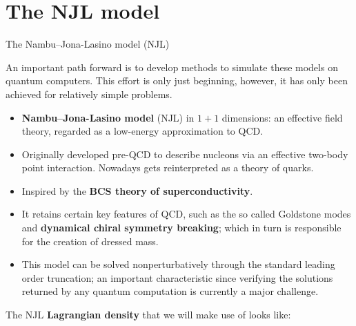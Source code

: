
\section{The NJL model}


\begin{frame}[allowframebreaks]{The Nambu--Jona-Lasino model (NJL)}

	An important path forward is to develop methods to simulate these models on quantum computers. This effort is only just beginning, however, it has only been achieved for relatively simple problems.

	\medskip

	\begin{itemize}
		\item<2-> \textbf{Nambu--Jona-Lasino model} (NJL) in $1+1$ dimensions: an effective field theory, regarded as a low-energy approximation to QCD.
    \item<2-> Originally developed pre-QCD to describe nucleons via an effective two-body point interaction. Nowadays gets reinterpreted as a theory of quarks.
    \item<2-> Inspired by the \textbf{BCS theory of superconductivity}.
		\item<3-> It retains certain key features of QCD, such as the so called Goldstone modes and \textbf{dynamical chiral symmetry breaking}; which in turn is responsible for the creation of dressed mass.
		\item<4-> This model can be solved nonperturbatively through the standard leading order truncation; an important characteristic since verifying the solutions returned by any quantum computation is currently a major challenge.
	\end{itemize}

\break

	The NJL \textbf{Lagrangian density} that we will make use of looks like:


\end{frame}
